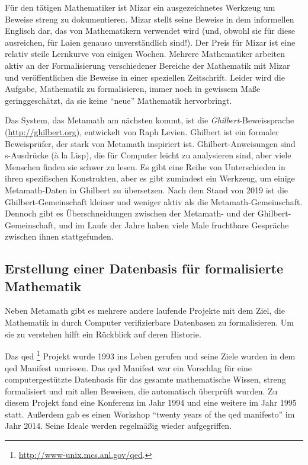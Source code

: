 Für den tätigen Mathematiker ist Mizar ein ausgezeichnetes Werkzeug um Beweise streng zu dokumentieren. Mizar stellt seine Beweise in dem informellen Englisch dar, das von Mathematikern verwendet wird (und, obwohl sie für diese ausreichen, für Laien genauso unverständlich sind!). Der Preis für Mizar ist eine relativ steile Lernkurve von einigen Wochen.  Mehrere Mathematiker arbeiten aktiv an der Formalisierung verschiedener Bereiche der Mathematik mit Mizar und veröffentlichen die Beweise in einer speziellen Zeitschrift. Leider wird die Aufgabe, Mathematik zu formalisieren, immer noch in gewissem Maße geringgeschätzt, da sie keine "`neue"' Mathematik hervorbringt.

Das System, das Metamath am nächsten kommt, ist die {\em Ghilbert}-Beweis\-spra\-che (\url{http://ghilbert.org}), entwickelt von Raph Levien.
Ghilbert ist ein formaler Beweisprüfer, der stark von Metamath inspiriert ist.
Ghilbert-Anweisungen sind s-Ausdrücke (à la Lisp), die für Computer leicht zu analysieren sind, aber viele Menschen finden sie schwer zu lesen.
Es gibt eine Reihe von Unterschieden in ihren spezifischen Konstrukten, aber es gibt zumindest ein Werkzeug, um einige Metamath-Daten in Ghilbert zu übersetzen.
Nach dem Stand von 2019 ist die Ghilbert-Gemeinschaft kleiner und weniger aktiv als die Metamath-Gemeinschaft.
Dennoch gibt es Überschneidungen zwischen der Metamath- und der Ghilbert-Gemeinschaft, und im Laufe der Jahre haben viele Male fruchtbare Gespräche zwischen ihnen  stattgefunden.

\subsection{Erstellung einer Datenbasis für formalisierte\\ Mathematik}\label{mathdatabase}

Neben Metamath gibt es mehrere andere laufende Projekte mit dem Ziel, die Mathematik in durch Computer verifizierbare Datenbasen zu formalisieren.  Um sie zu verstehen hilft ein Rückblick auf deren Historie.

Das {\sc qed}%
\footnote{\url{http://www-unix.mcs.anl.gov/qed}.}
Projekt wurde 1993 ins Leben gerufen und seine Ziele wurden in dem {\sc qed} Manifest umrissen.
Das {\sc qed} Manifest war ein Vorschlag für eine computergestützte Datenbasis für das gesamte mathematische Wissen, streng formalisiert und mit allen Beweisen, die automatisch überprüft wurden.
Zu diesem Projekt fand eine Konferenz im Jahr 1994 und eine weitere im Jahr 1995 statt. Außerdem gab es einen Workshop "`twenty years of the {\sc qed} manifesto"' im Jahr 2014.
Seine Ideale werden regelmäßig wieder aufgegriffen.

